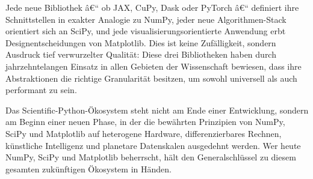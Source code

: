 \documentclass[12pt, a4paper]{article}
\begin{document}
Jede neue Bibliothek â€“ ob JAX, CuPy, Dask oder PyTorch â€“ definiert ihre
Schnittstellen in exakter Analogie zu NumPy, jeder neue Algorithmen-Stack
orientiert sich an SciPy, und jede visualisierungsorientierte Anwendung
erbt Designentscheidungen von Matplotlib. Dies ist keine Zufälligkeit,
sondern Ausdruck tief verwurzelter Qualität: Diese drei Bibliotheken haben
durch jahrzehntelangen Einsatz in allen Gebieten der Wissenschaft bewiesen,
dass ihre Abstraktionen die richtige Granularität besitzen, um sowohl
universell als auch performant zu sein.

Das Scientific-Python-Ökosystem steht nicht am Ende einer Entwicklung,
sondern am Beginn einer neuen Phase, in der die bewährten Prinzipien von
NumPy, SciPy und Matplotlib auf heterogene Hardware, differenzierbares
Rechnen, künstliche Intelligenz und planetare Datenskalen ausgedehnt werden.
Wer heute NumPy, SciPy und Matplotlib beherrscht, hält den
Generalschlüssel zu diesem gesamten zukünftigen Ökosystem in Händen.

\end{document}

